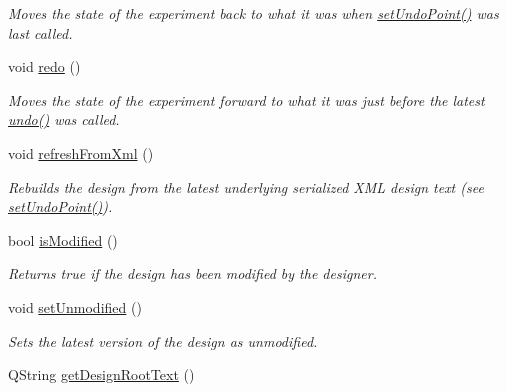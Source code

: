 \begin{DoxyCompactItemize}
\begin{DoxyCompactList}\small\item\em Moves the state of the experiment back to what it was when \hyperlink{class_picto_1_1_design_root_a0be90b8e58e958fea095f0650f865c46}{set\-Undo\-Point()} was last called. \end{DoxyCompactList}\item 
void \hyperlink{class_picto_1_1_design_root_a9f254dea700b90bc4f27d07cc4aa3bda}{redo} ()
\begin{DoxyCompactList}\small\item\em Moves the state of the experiment forward to what it was just before the latest \hyperlink{class_picto_1_1_design_root_a8f57a2f9ebb4fd5065a6f36b4d8a4b90}{undo()} was called. \end{DoxyCompactList}\item 
void \hyperlink{class_picto_1_1_design_root_a3fed86206f2accefe56685239e5ff391}{refresh\-From\-Xml} ()
\begin{DoxyCompactList}\small\item\em Rebuilds the design from the latest underlying serialized X\-M\-L design text (see \hyperlink{class_picto_1_1_design_root_a0be90b8e58e958fea095f0650f865c46}{set\-Undo\-Point()}). \end{DoxyCompactList}\item 
bool \hyperlink{class_picto_1_1_design_root_a7adddf09b9189a2cd5e37dd4313e39a8}{is\-Modified} ()
\begin{DoxyCompactList}\small\item\em Returns true if the design has been modified by the designer. \end{DoxyCompactList}\item 
void \hyperlink{class_picto_1_1_design_root_a796f283227a5a979194349991990bf22}{set\-Unmodified} ()
\begin{DoxyCompactList}\small\item\em Sets the latest version of the design as unmodified. \end{DoxyCompactList}\item 
\hypertarget{class_picto_1_1_design_root_a3b6c039da1c86d1a80bc7be28129d1d9}{Q\-String \hyperlink{class_picto_1_1_design_root_a3b6c039da1c86d1a80bc7be28129d1d9}{get\-Design\-Root\-Text} ()}\label{class_picto_1_1_design_root_a3b6c039da1c86d1a80bc7be28129d1d9}


\end{DoxyCompactItemize}
